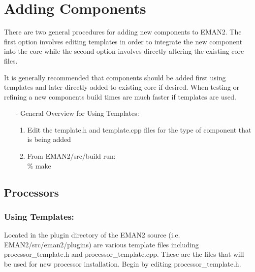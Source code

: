 \section{Adding Components}
  \label{ADDING-COMPONENTS}

There are two general procedures for adding new components to EMAN2.
The first option involves editing templates in order to integrate the
new component into the core while the second option involves directly
altering the existing core files.  

It is generally recommended that components should be added first
using templates and later directly added to existing core if 
desired.  When testing or refining a new components build times are much
faster if templates are used.  
\begin{itemize}
  \item[-]
    General Overview for Using Templates:
    \begin{enumerate}
    \item
      Edit the template.h and template.cpp files for the type of
      component that is being added
    \item
      From EMAN2/src/build run:\\
      \% make
    \end{enumerate}
\end{itemize}

\subsection{Processors}
  \label{ADDING-PROCESSORS} 

      \subsubsection{Using Templates:}
      Located in the plugin directory of the EMAN2 source
      (i.e. EMAN2/src/eman2/plugins) are various template files including
      processor_template.h and processor_template.cpp.  These are the files
      that will be used for new processor installation.  Begin by editing
      processor_template.h. 

